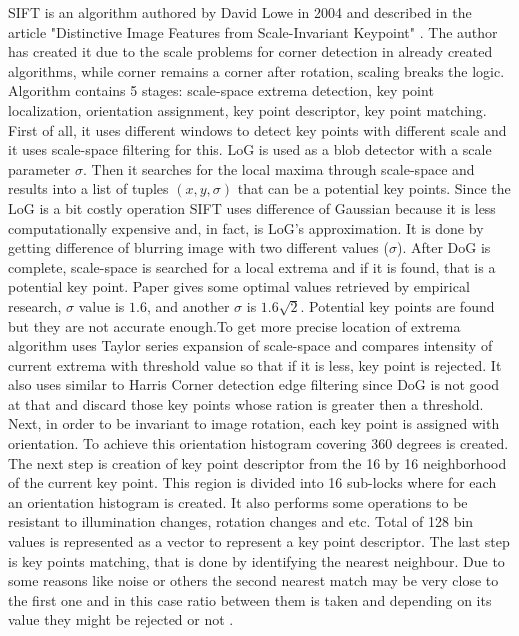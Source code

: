 \documentclass[../../../../main]{subfiles}
\begin{document}
\ac{SIFT} is an algorithm authored by David Lowe in 2004 and described in the article "Distinctive Image Features from Scale-Invariant Keypoint" \cite{distinctive_features_si_lowe}. The author has created it due to the scale problems for corner detection in already created algorithms, while corner remains a corner after rotation, scaling breaks the logic. Algorithm contains 5 stages: scale-space extrema detection, key point localization, orientation assignment, key point descriptor, key point matching. First of all, it uses different windows to detect key points with different scale and it uses scale-space filtering for this. \ac{LoG} is used as a blob detector with a scale parameter $\sigma$. Then it searches for the local maxima through scale-space and results into a list of tuples $(x,y,\sigma)$ that can be a potential key points. Since the  \ac{LoG} is a bit costly operation \ac{SIFT} uses difference of Gaussian because it is less computationally expensive and, in fact, is \ac{LoG}'s approximation. It is done by getting difference of blurring image with two different values ($\sigma$). After \ac{DoG} is complete, scale-space is searched for a local extrema and if it is found, that is a potential key point. Paper gives some optimal values retrieved by empirical research, $\sigma$ value is $1.6$, and another $\sigma$ is $1.6\sqrt{2}$. Potential key points are found but they are not accurate enough.To get more precise location of extrema algorithm uses Taylor series expansion of scale-space and compares intensity of current extrema with threshold value so that if it is less, key point is rejected. It also uses similar to Harris Corner detection edge filtering since \ac{DoG} is not good at that and discard those key points whose ration is greater then a threshold. Next, in order to be invariant to image rotation, each key point is assigned with orientation. To achieve this orientation histogram covering 360 degrees is created. The next step is creation of key point descriptor from the 16 by 16 neighborhood of the current key point. This region is divided into 16 sub-locks where for each an orientation histogram is created. It also performs some operations to be resistant to illumination changes, rotation changes and etc. Total of 128 bin values is represented as a vector to represent a key point descriptor. The last step is key points matching, that is done by identifying the nearest neighbour. Due to some reasons like noise or others the second nearest match may be very close to the first one and in this case ratio between them is taken and depending on its value they might be rejected or not \cite{opencv_docs_sift}.
\end{document}
